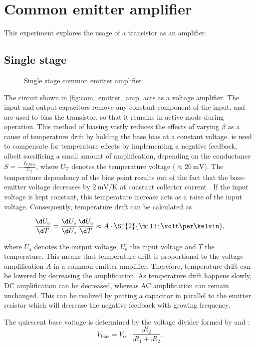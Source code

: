 \chapter{Common emitter amplifier}
This experiment explores the usage of a transistor as an amplifier.

\section{Single stage}
\begin{figure}[tbp]
	\centering
	\caption[Single Stage Common Emitter Amplifier]{Single stage common emitter amplifier}
	\label{fig:com_emitter_amp}
\end{figure}
The circuit shown in \autoref{fig:com_emitter_amp} acts as a voltage amplifier.
The input and output capacitors remove any constant component of the input.
 and  are used to bias the transistor, so that it remains in active mode during operation.
This method of biasing vastly reduces the effects of varying $\beta$ as a cause of temperature drift by holding the base bias at a constant voltage.
 is used to compensate for temperature effects by implementing a negative feedback, albeit sacrificing a small amount of amplification, depending on the conductance $S=-\frac{I_\text{C,bias}}{U_\text{T}}$, where $U_\text{T}$ denotes the temperature voltage ($\approx\SI{26}{\milli\volt}$).
The temperature dependency of the bias point results out of the fact that the base-emitter voltage  decreases by $\SI{2}{\milli\volt\per\kelvin}$ at constant collector current .
If the input voltage is kept constant, this temperature increase acts as a raise of the input voltage.
Consequently, temperature drift can be calculated as

\begin{equation}
	\frac{\d U_\text{a}}{\d T}=\frac{\d U_\text{a}}{\d U_\text{e}}\frac{\d U_\text{a}}{\d T}\approx A\cdot\SI{2}{\milli\volt\per\kelvin},
\end{equation}

where $U_\text{a}$ denotes the output voltage, $U_\text{e}$ the input voltage and $T$ the temperature.
This means that temperature drift is proportional to the voltage amplification $A$ in a common emitter amplifier.
Therefore, temperature drift can be lowered by decreasing the amplification.
As temperature drift happens slowly, DC amplification can be decreased, whereas AC amplification can remain unchanged.
This can be realized by putting a capacitor  in parallel to the emitter resistor  which will decrease the negative feedback with growing frequency.

The quiescent base voltage is determined by the voltage divider formed by  and :
\begin{equation*}
	V_\text{bias}=V_\text{cc}\cdot\frac{\comp{R_2}}{\comp{R_1}+\comp{R_2}}.
\end{equation*}
